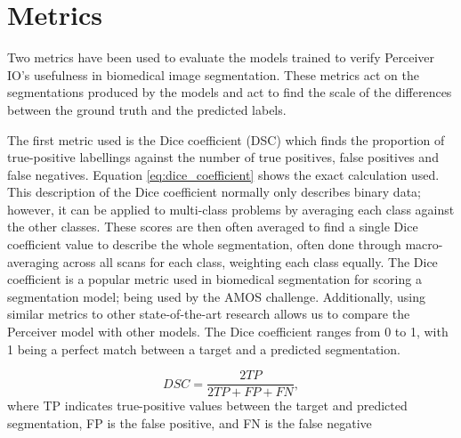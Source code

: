 \documentclass{l4proj}
\begin{document}



\section{Metrics}

Two metrics have been used to evaluate the models trained to verify Perceiver IO’s usefulness in biomedical image segmentation. These metrics act on the segmentations produced by the models and act to find the scale of the differences between the ground truth and the predicted labels.

The first metric used is the Dice coefficient (DSC) which finds the proportion of true-positive labellings against the number of true positives, false positives and false negatives. Equation \ref{eq:dice_coefficient} shows the exact calculation used. This description of the Dice coefficient normally only describes binary data; however, it can be applied to multi-class problems by averaging each class against the other classes. These scores are then often averaged to find a single Dice coefficient value to describe the whole segmentation, often done through macro-averaging across all scans for each class, weighting each class equally. The Dice coefficient is a popular metric used in biomedical segmentation for scoring a segmentation model; being used by the AMOS challenge. Additionally, using similar metrics to other state-of-the-art research allows us to compare the Perceiver model with other models. The Dice coefficient ranges from 0 to 1, with 1 being a perfect match between a target and a predicted segmentation.

\begin{equation} \label{eq:dice_coefficient}
    DSC = \frac{2 TP}{2 TP + FP + FN},
\end{equation}
where TP indicates true-positive values between the target and predicted segmentation, FP is the false positive, and FN is the false negative
\end{document}
